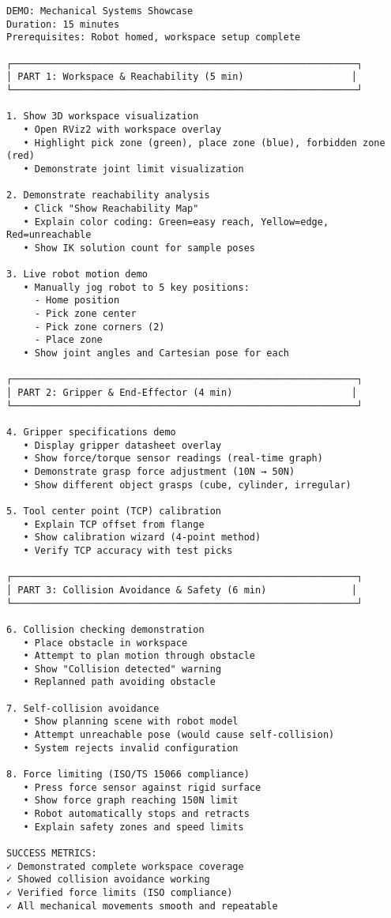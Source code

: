 \documentclass[
]{article}
\begin{document}
\begin{verbatim}
DEMO: Mechanical Systems Showcase
Duration: 15 minutes
Prerequisites: Robot homed, workspace setup complete

┌─────────────────────────────────────────────────────────────┐
│ PART 1: Workspace & Reachability (5 min)                   │
└─────────────────────────────────────────────────────────────┘

1. Show 3D workspace visualization
   • Open RViz2 with workspace overlay
   • Highlight pick zone (green), place zone (blue), forbidden zone (red)
   • Demonstrate joint limit visualization

2. Demonstrate reachability analysis
   • Click "Show Reachability Map"
   • Explain color coding: Green=easy reach, Yellow=edge, Red=unreachable
   • Show IK solution count for sample poses

3. Live robot motion demo
   • Manually jog robot to 5 key positions:
     - Home position
     - Pick zone center
     - Pick zone corners (2)
     - Place zone
   • Show joint angles and Cartesian pose for each

┌─────────────────────────────────────────────────────────────┐
│ PART 2: Gripper & End-Effector (4 min)                     │
└─────────────────────────────────────────────────────────────┘

4. Gripper specifications demo
   • Display gripper datasheet overlay
   • Show force/torque sensor readings (real-time graph)
   • Demonstrate grasp force adjustment (10N → 50N)
   • Show different object grasps (cube, cylinder, irregular)

5. Tool center point (TCP) calibration
   • Explain TCP offset from flange
   • Show calibration wizard (4-point method)
   • Verify TCP accuracy with test picks

┌─────────────────────────────────────────────────────────────┐
│ PART 3: Collision Avoidance & Safety (6 min)               │
└─────────────────────────────────────────────────────────────┘

6. Collision checking demonstration
   • Place obstacle in workspace
   • Attempt to plan motion through obstacle
   • Show "Collision detected" warning
   • Replanned path avoiding obstacle

7. Self-collision avoidance
   • Show planning scene with robot model
   • Attempt unreachable pose (would cause self-collision)
   • System rejects invalid configuration

8. Force limiting (ISO/TS 15066 compliance)
   • Press force sensor against rigid surface
   • Show force graph reaching 150N limit
   • Robot automatically stops and retracts
   • Explain safety zones and speed limits

SUCCESS METRICS:
✓ Demonstrated complete workspace coverage
✓ Showed collision avoidance working
✓ Verified force limits (ISO compliance)
✓ All mechanical movements smooth and repeatable
\end{verbatim}
\end{document}
